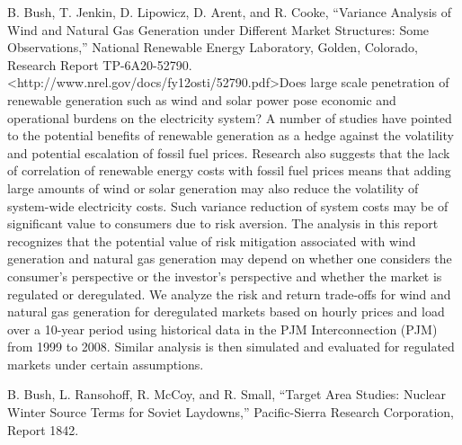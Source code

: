 \documentclass[]{article}
\begin{document}
B. Bush, T. Jenkin, D. Lipowicz, D. Arent, and R. Cooke, ``Variance
Analysis of Wind and Natural Gas Generation under Different Market
Structures: Some Observations,'' National Renewable Energy Laboratory,
Golden, Colorado, Research Report TP-6A20-52790.
\textless{}http://www.nrel.gov/docs/fy12osti/52790.pdf\textgreater{}Does
large scale penetration of renewable generation such as wind and solar
power pose economic and operational burdens on the electricity system? A
number of studies have pointed to the potential benefits of renewable
generation as a hedge against the volatility and potential escalation of
fossil fuel prices. Research also suggests that the lack of correlation
of renewable energy costs with fossil fuel prices means that adding
large amounts of wind or solar generation may also reduce the volatility
of system-wide electricity costs. Such variance reduction of system
costs may be of significant value to consumers due to risk aversion. The
analysis in this report recognizes that the potential value of risk
mitigation associated with wind generation and natural gas generation
may depend on whether one considers the consumer's perspective or the
investor's perspective and whether the market is regulated or
deregulated. We analyze the risk and return trade-offs for wind and
natural gas generation for deregulated markets based on hourly prices
and load over a 10-year period using historical data in the PJM
Interconnection (PJM) from 1999 to 2008. Similar analysis is then
simulated and evaluated for regulated markets under certain assumptions.

B. Bush, L. Ransohoff, R. McCoy, and R. Small, ``Target Area Studies:
Nuclear Winter Source Terms for Soviet Laydowns,'' Pacific-Sierra
Research Corporation, Report 1842.
\end{document}
